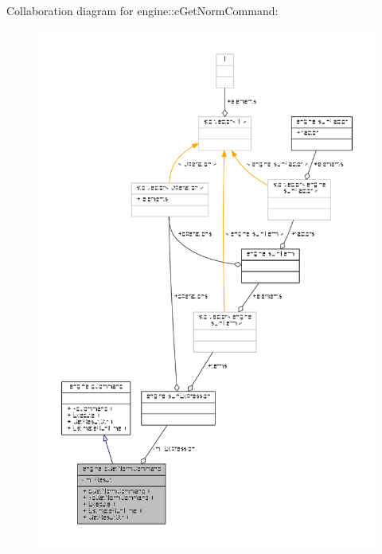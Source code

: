 Collaboration diagram for engine\-:\-:c\-Get\-Norm\-Command\-:
\nopagebreak
\begin{figure}[H]
\begin{center}
\leavevmode
\includegraphics[width=350pt]{classengine_1_1cGetNormCommand__coll__graph}
\end{center}
\end{figure}
